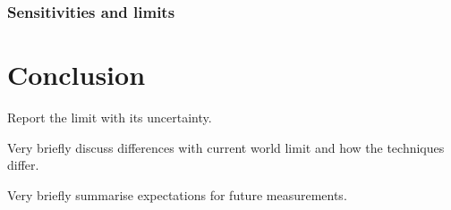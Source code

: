 \documentclass[12pt]{article}
\begin{document}
\subsubsection{Sensitivities and limits}

\section{Conclusion}
Report the limit with its uncertainty.

Very briefly discuss differences with current world limit and how the techniques differ.

Very briefly summarise expectations for future measurements.



\end{document}

